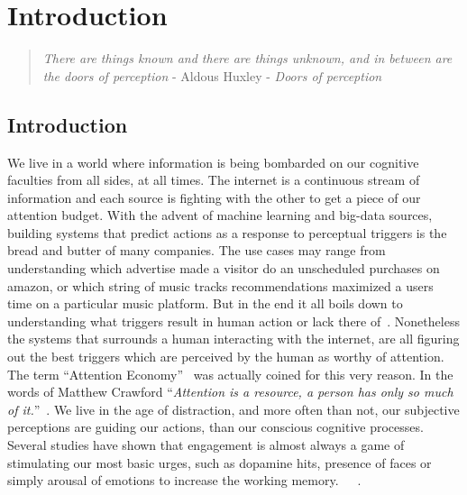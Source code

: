 
\chapter{Introduction}  %
\label{chap:Intro}

\graphicspath{{Chapter1/Figures/} {Chapter1/Figures}}
\begin{quote}
\textsl{There are things known and there are things unknown, and in between are the doors of perception} - Aldous Huxley - \textsl{Doors of perception}
\end{quote}


\section{Introduction}

We live in a world where information is being bombarded on our cognitive faculties from all sides, at all times. The internet is a continuous stream of information and each source is fighting with the other to get a piece of our attention budget. 
With the advent of machine learning and big-data sources, building systems that predict actions as a response to perceptual triggers is the bread and butter of many companies. The use cases may range from understanding which advertise made a visitor do an unscheduled purchases on amazon, or which string of music tracks recommendations maximized a users time on a particular music platform. But in the end it all boils down to understanding what triggers result in human action or lack there of~\cite{song2012survey}. Nonetheless the systems that surrounds a human interacting with the internet, are all figuring out the best triggers which are perceived by the human as worthy of attention. 
The term ``Attention Economy''~\cite{davenport2001attention} was actually coined for this very reason. In the words of Matthew Crawford ``\textit{Attention is a resource, a person has only so much of it.}''~\cite{MatthewCrawford}. We live in the age of distraction, and more often than not, our subjective perceptions are guiding our actions, than our conscious cognitive processes. Several studies have shown that engagement is almost always a game of stimulating our most basic urges, such as dopamine hits, presence of faces or simply arousal of emotions to increase the working memory.~\cite{bakhshi2014faces,joglekar2017like}~\cite{schupp2006emotion}~\cite{soat2015social}. 


